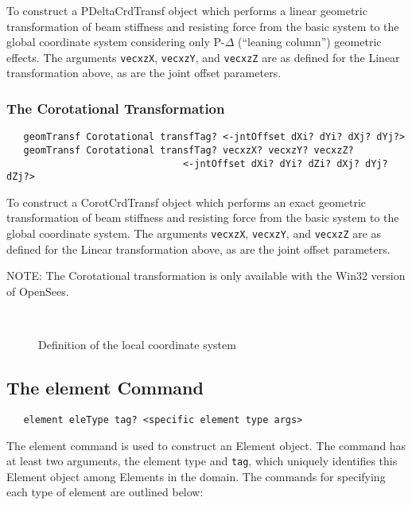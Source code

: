 \documentclass[12pt]{article}
\begin{document}
To construct a PDeltaCrdTransf object which performs a linear geometric
transformation of beam stiffness and resisting force from the basic system
to the global coordinate system considering only P-$\Delta$
(``leaning column'') geometric effects.
The arguments {\tt vecxzX}, {\tt vecxzY}, and {\tt vecxzZ} are as defined for
the Linear transformation above, as are the joint offset parameters.


\subsubsection{The Corotational Transformation}
{\sf\small
\begin{verbatim}
   geomTransf Corotational transfTag? <-jntOffset dXi? dYi? dXj? dYj?>
   geomTransf Corotational transfTag? vecxzX? vecxzY? vecxzZ? 
                               <-jntOffset dXi? dYi? dZi? dXj? dYj? dZj?>
\end{verbatim}
}

To construct a CorotCrdTransf object which performs an exact geometric
transformation of beam stiffness and resisting force from the basic system
to the global coordinate system. The arguments {\tt vecxzX}, {\tt vecxzY},
and {\tt vecxzZ} are as defined for
the Linear transformation above, as are the joint offset parameters.

NOTE: The Corotational transformation is only available with the Win32 version
of OpenSees.

\begin{figure}[htpb]
\begin{center}
\leavevmode
\hbox{%
}
\end{center}
\caption{Definition of the local coordinate system}
\label{localAxis}
\end{figure}

\subsection{The element Command}
{\sf\small
\begin{verbatim}
   element eleType tag? <specific element type args>
\end{verbatim}
}

The element command is used to construct an Element object. The
command has at least two arguments, the element type and {\tt tag},
which uniquely
identifies this Element object among Elements in the domain.
The commands for specifying each type of element are outlined below:  
\end{document}
